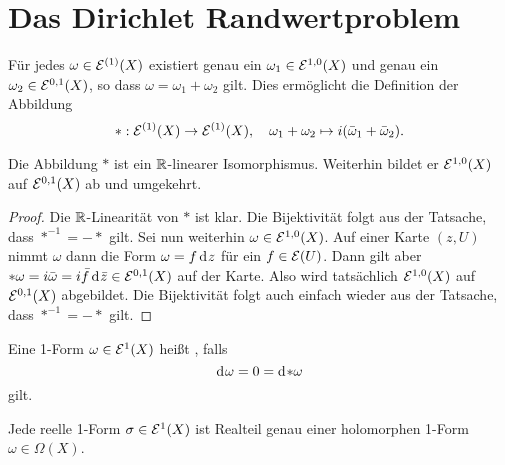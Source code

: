 
\section{Das Dirichlet Randwertproblem}
\label{sec:Dirichlet}

\begin{defin}
  Für jedes $\omega \in \mathcal{E}^{(1)}(X)$ existiert genau ein $\omega_1
  \in \mathcal{E}^{1,0}(X)$ und genau ein $\omega_2 \in \mathcal{E}^{0,1}(X)$, so
  dass $\omega = \omega_1 + \omega_2$ gilt. Dies ermöglicht die
  Definition der Abbildung
  \[
  \ast : \mathcal{E}^{(1)}(X) \rightarrow \mathcal{E}^{(1)}(X), \quad \omega_1 + \omega_2
  \mapsto i(\bar \omega_1 + \bar \omega_2).
  \]
\end{defin}

\begin{prop}
  Die Abbildung $\ast$ ist ein $\mathbb{R}$-linearer Isomorphismus. Weiterhin
  bildet er $\mathcal{E}^{1,0}(X)$ auf $\mathcal{E}^{0,1}(X)$ ab und umgekehrt.
\end{prop}

\begin{proof}
  Die $\mathbb{R}$-Linearität von $\ast$ ist klar. Die Bijektivität folgt aus
  der Tatsache, dass $\ast^{-1} = - \ast$ gilt. Sei nun weiterhin
  $\omega \in \mathcal{E}^{1,0}(X)$. Auf einer Karte $(z,U)$ nimmt $\omega$
  dann die Form $\omega = f \d[z]$ für ein $f \in \mathcal{E}(U)$. Dann gilt
  aber $\ast \omega = i \bar \omega = i \bar f \d[\bar z] \in
  \diff^{0,1}(X)$ auf der Karte. Also wird tatsächlich
  $\mathcal{E}^{1,0}(X)$ auf $\mathcal{E}^{0,1}(X)$ abgebildet. Die Bijektivität
  folgt auch einfach wieder aus der Tatsache, dass $\ast^{-1} = -
  \ast$ gilt.
\end{proof}

\begin{defin}
  Eine 1-Form $\omega \in \mathcal{E}^1(X)$ heißt , falls
  \[
  \d[\omega] = 0 = \d[\ast \omega]
  \]
  gilt.
\end{defin}

\begin{thm}
  \label{thm:harm-form}
  Jede reelle 1-Form $\sigma \in \mathcal{E}^1(X)$ ist Realteil genau einer
  holomorphen 1-Form $\omega \in \Omega(X)$.
\end{thm}

